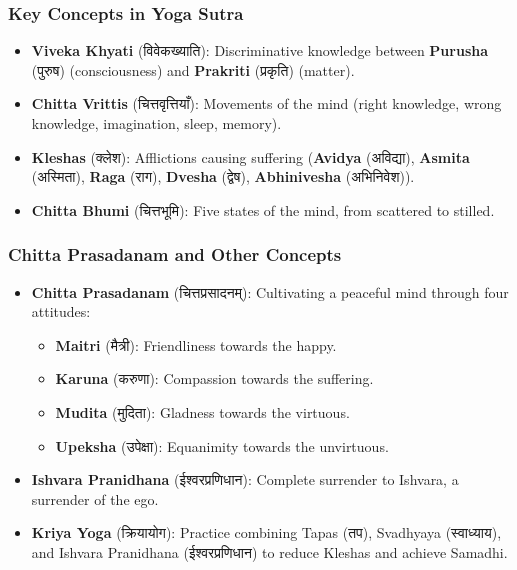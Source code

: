 \begin{frame}[fragile]\frametitle{Key Concepts in Yoga Sutra}
    \begin{itemize}
        \item \textbf{Viveka Khyati} (विवेकख्याति): Discriminative knowledge between \textbf{Purusha} (पुरुष) (consciousness) and \textbf{Prakriti} (प्रकृति) (matter).
        \item \textbf{Chitta Vrittis} (चित्तवृत्तियाँ): Movements of the mind (right knowledge, wrong knowledge, imagination, sleep, memory).
        \item \textbf{Kleshas} (क्लेश): Afflictions causing suffering (\textbf{Avidya} (अविद्या), \textbf{Asmita} (अस्मिता), \textbf{Raga} (राग), \textbf{Dvesha} (द्वेष), \textbf{Abhinivesha} (अभिनिवेश)).
        \item \textbf{Chitta Bhumi} (चित्तभूमि): Five states of the mind, from scattered to stilled.
    \end{itemize}
\end{frame}

\begin{frame}[fragile]\frametitle{Chitta Prasadanam and Other Concepts}
    \begin{itemize}
        \item \textbf{Chitta Prasadanam} (चित्तप्रसादनम्): Cultivating a peaceful mind through four attitudes:
        \begin{itemize}
            \item \textbf{Maitri} (मैत्री): Friendliness towards the happy.
            \item \textbf{Karuna} (करुणा): Compassion towards the suffering.
            \item \textbf{Mudita} (मुदिता): Gladness towards the virtuous.
            \item \textbf{Upeksha} (उपेक्षा): Equanimity towards the unvirtuous.
        \end{itemize}
        \item \textbf{Ishvara Pranidhana} (ईश्वरप्रणिधान): Complete surrender to Ishvara, a surrender of the ego.
        \item \textbf{Kriya Yoga} (क्रियायोग): Practice combining Tapas (तप), Svadhyaya (स्वाध्याय), and Ishvara Pranidhana (ईश्वरप्रणिधान) to reduce Kleshas and achieve Samadhi.
    \end{itemize}
\end{frame}


